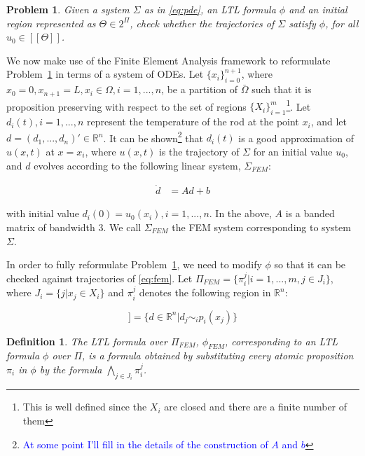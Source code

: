 \documentclass{article}
\newtheorem{definition}{Definition}
\newtheorem{problem}{Problem}
\newcommand*{\R}{\mathbb{R}}
\newcommand*{\psat}[1]{[[#1]]}
\newcommand*{\fran}[1]{\textcolor{blue}{#1}}
\begin{document}
\begin{problem}\label{pr:pde}
    Given a system $\Sigma$ as in \eqref{eq:pde}, an LTL formula $\phi$ and an
    initial region represented as $\Theta \in 2^\Pi$, check whether the trajectories of $\Sigma$
    satisfy $\phi$, for all $u_0 \in \psat{\Theta}$.
\end{problem}

We now make use of the Finite Element Analysis framework to reformulate
Problem~\ref{pr:pde} in terms of a system of ODEs. Let $\{x_i\}_{i = 0}^{n +
1}$, where $x_0 = 0, x_{n+1} = L, x_i \in \Omega, i = 1,...,n$, be a partition of
$\bar\Omega$ such that it is proposition preserving with respect to the set of
regions $\{X_i\}_{i = 1}^{m}$\footnote{This is well defined since the $X_i$ are
closed and there are a finite number of them}. Let $d_i(t), i = 1,...,n$ represent the
temperature of the rod at the point $x_i$, and let $d = (d_1, ..., d_n)' \in
\R^n$. It can be shown\footnote{\fran{At some point I'll fill in the details of the
construction of $A$ and $b$}} that $d_i(t)$ is a good approximation of 
$u(x, t)$ at $x=x_i$, where $u(x,t)$ is the trajectory of $\Sigma$ for an
initial value $u_0$, and $d$ evolves
according to the following linear system, $\Sigma_{FEM}$:

\begin{equation}\label{eq:fem}
    \begin{aligned}
        \dot{d} &= A d + b
    \end{aligned}
\end{equation}

with initial value $d_i(0) = u_0(x_i), i = 1,...,n$. In the above, $A$ is a
banded matrix of bandwidth 3. We call $\Sigma_{FEM}$ the FEM system
corresponding to system $\Sigma$.

In order to fully reformulate Problem~\ref{pr:pde}, we need to modify $\phi$ so
that it can be checked against trajectories of \eqref{eq:fem}. Let $\Pi_{FEM} =
\{\pi_i^j | i =1,...,m, j \in J_i\}$, where $J_i = \{j | x_j \in X_i\}$ and
$\pi_i^j$ denotes the following region in $\R^n$:

\begin{equation}
    \psat{\pi_i^j} = \{d \in \R^n | d_j \sim_i p_i(x_j)\}
\end{equation}

\begin{definition}\label{def:femformula}
    The LTL formula over $\Pi_{FEM}$, $\phi_{FEM}$, corresponding to an LTL formula
    $\phi$ over $\Pi$, is a formula obtained by substituting every atomic
    proposition $\pi_i$ in $\phi$ by the formula $\bigwedge_{j \in J_i}
    \pi_i^j$.
\end{definition}
\end{document}
